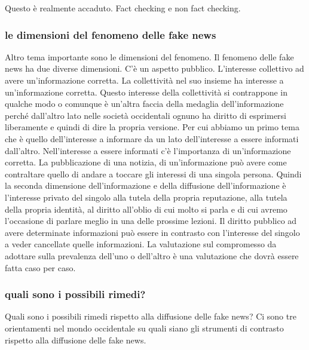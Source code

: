 Questo è realmente accaduto. Fact checking e non fact checking. 

\subsubsection{le dimensioni del fenomeno delle fake news}

Altro tema importante sono le dimensioni del fenomeno. Il fenomeno delle fake news ha due diverse dimensioni.
C'è un aspetto pubblico. L'interesse collettivo ad avere un'informazione corretta. La collettività nel suo insieme ha interesse a un'informazione corretta. Questo interesse della collettività si contrappone in qualche modo o comunque è un'altra faccia della medaglia dell'informazione perché dall'altro lato nelle società occidentali ognuno ha diritto di esprimersi liberamente e quindi di dire la propria versione. 
Per cui abbiamo un primo tema che è quello dell'interesse a informare da un lato dell'interesse a essere informati dall'altro. Nell'interesse a essere informati c'è l'importanza di un'informazione corretta. 
La pubblicazione di una notizia, di un'informazione può avere come contraltare quello di andare a toccare gli interessi di una singola persona. Quindi la seconda dimensione dell'informazione e della diffusione dell'informazione è l'interesse privato del singolo alla tutela della propria reputazione, alla tutela della propria identità, al diritto all'oblio di cui molto si parla e di cui avremo l'occasione di parlare meglio in una delle prossime lezioni. 
Il diritto pubblico ad avere determinate informazioni può essere in contrasto con l'interesse del singolo a veder cancellate quelle informazioni. La valutazione sul compromesso da adottare sulla prevalenza dell'uno o dell'altro è una valutazione che dovrà essere fatta caso per caso. 

\subsubsection{quali sono i possibili rimedi?}

Quali sono i possibili rimedi rispetto alla diffusione delle fake news? Ci sono tre orientamenti nel mondo occidentale su quali siano gli strumenti di contrasto rispetto alla diffusione delle fake news.

